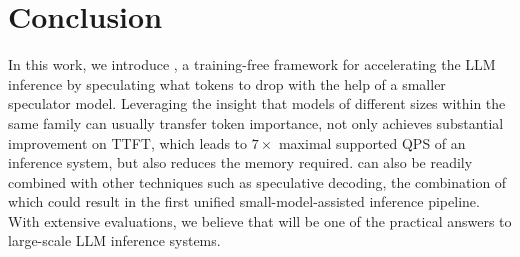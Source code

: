 \section{Conclusion}

In this work, we introduce \ours{}, a training-free framework for accelerating the LLM inference by speculating what tokens to drop with the help of a smaller speculator model. Leveraging the insight that models of different sizes within the same family can usually transfer token importance, \ours{} not only achieves substantial improvement on TTFT, which leads to $7\times$ maximal supported QPS of an inference system, but also reduces the memory required. \ours{} can also be readily combined with other techniques such as speculative decoding, the combination of which could result in the first unified small-model-assisted inference pipeline. With extensive evaluations, we believe that \ours{} will be one of the practical answers to large-scale LLM inference systems. 